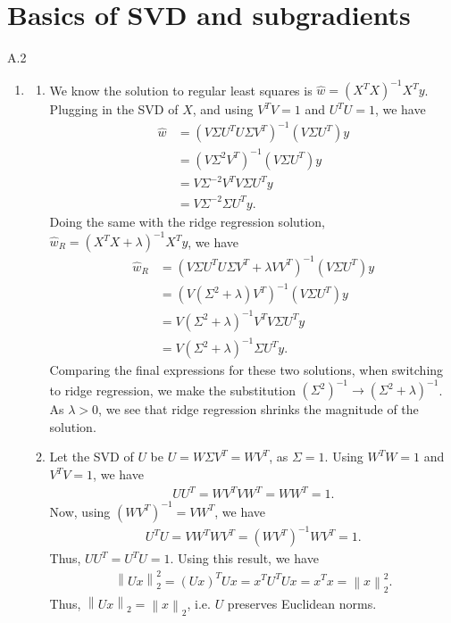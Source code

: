 \documentclass{article}
\newcommand{\norm}[1]{\left\|#1\right\|}
\begin{document}
\section*{Basics of SVD and subgradients}

A.2
\begin{enumerate}
        \item
        \begin{enumerate}
        \item We know the solution to regular least squares is $\hat{w} = (X^T X)^{-1} X^T y$.
        Plugging in the SVD of $X$, and using $V^T V = 1$ and $U^T U = 1$, we have
        \begin{align*}
                \hat{w}
                &= (V \Sigma U^T U \Sigma V^T)^{-1} (V \Sigma U^T) y \\
                &= (V \Sigma^2 V^T)^{-1} (V \Sigma U^T) y \\
                &= V \Sigma^{-2} V^T V \Sigma U^T y \\
                &= V \Sigma^{-2} \Sigma U^T y.
        \end{align*}
        Doing the same with the ridge regression solution, $\hat{w}_R = (X^T X + \lambda)^{-1} X^T y$, we have
        \begin{align*}
                \hat{w}_R 
                &= (V \Sigma U^T U \Sigma V^T + \lambda V V^T)^{-1} (V \Sigma U^T) y \\
                &= (V (\Sigma^2 + \lambda) V^T)^{-1} (V \Sigma U^T)y \\
                &= V (\Sigma^2 + \lambda)^{-1} V^T V \Sigma U^T y \\
                &= V (\Sigma^2 + \lambda)^{-1} \Sigma U^T y.
        \end{align*}
        Comparing the final expressions for these two solutions, when switching to ridge regression, we make the substitution $(\Sigma^2)^{-1} \to (\Sigma^2 + \lambda)^{-1}$.
        As $\lambda > 0$, we see that ridge regression shrinks the magnitude of the solution.

        \item Let the SVD of $U$ be $U = W \Sigma V^T = W V^T$, as $\Sigma = 1$.
        Using $W^T W = 1$ and $V^T V = 1$, we have
        \begin{align*}
                U U^T = W V^T V W^T = W W^T = 1.
        \end{align*}
        Now, using $(W V^T)^{-1} = V W^T$, we have
        \begin{align*}
                U^T U = V W^T W V^T = (W V^T)^{-1} W V^T = 1.
        \end{align*}
        Thus, $U U^T = U^T U = 1$.
        Using this result, we have
        \begin{align*}
                \norm{Ux}_2^2 = (Ux)^T Ux = x^T U^T U x = x^T x = \norm{x}_2^2.
        \end{align*}
        Thus, $\norm{Ux}_2 = \norm{x}_2$, i.e. $U$ preserves Euclidean norms.
        \end{enumerate}


\end{enumerate}
\end{document}
